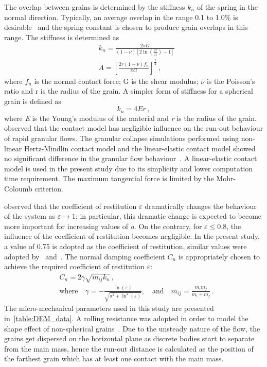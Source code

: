 The overlap between grains is determined by the stiffness 
$\textit{k}_{{n}}$ of the spring in the normal direction. Typically, 
an average overlap in the range 0.1 to 1.0\% is desirable~\citep{Zenit2005} and 
the spring constant is chosen to produce grain overlaps in this range. The 
stiffness is determined as
\begin{align}
& \textit{k}_{{n}}=\frac{2 \pi 
G}{(1-\nu)\left[2\ln(\frac{2r}{A})-1\right]} \\ 
& A = \left[\frac{2r(1-\nu)f_{n}}{\pi G}\right]^{\frac{1	}{2}}\,,
\end{align}
where $f_{n}$ is the normal contact force; G is the shear modulus; $\nu$ is the 
Poisson's ratio and r is the radius of the grain. A simpler form of stiffness 
for a spherical grain is defined as
\begin{equation}
\textit{k}_{{n}}=4Er\,,
\end{equation}
where \textit{E} is the Young's modulus of the material and \textit{r} is the 
radius of the grain.~\citet{Cambou2009} observed that the contact model has 
negligible influence on the run-out behaviour of rapid granular flows. The 
granular collapse simulations performed using non-linear Hertz-Mindlin contact 
model and the linear-elastic contact model showed no significant difference in 
the granular flow behaviour~\citep{Utili2014}. A linear-elastic contact model 
is used in the present study due to its simplicity and lower computation time 
requirement. The maximum tangential force is limited by the Mohr-Coloumb 
criterion. 

\citet{Staron2007a} observed that the coefficient of restitution $\varepsilon$ 
dramatically changes the behaviour of the system as $\varepsilon\rightarrow 
1$; in particular, this dramatic change is expected to become more important 
for increasing values of \textit{a}. On the contrary, for $\varepsilon \le 
0.8$, the influence of the coefficient of restitution becomes negligible. In 
the present study, a value of 0.75 is adopted as the coefficient of 
restitution, similar values were adopted 
by~\citet{Girolami} and~\citet{Zenit2005}. The normal damping coefficient 
$C_{{n}}$ is appropriately chosen to achieve the required coefficient of 
restitution 
$\varepsilon$:
\begin{align}
& C_{{n}}=2\gamma \sqrt{m_{{ij}}k_{{n}}} \,,\\ 
& \mbox{where} \quad \gamma = -\frac{\ln(\varepsilon)}{\sqrt{\pi^{2}+\ln^2 
(\varepsilon)}},\quad \mbox{and} \quad 
\textit{m}_{{ij}}=\frac{\textit{m}_{{i}}\textit{m}_{{j}}}{\textit{m}_{{i}}
 + \textit{m}_{{j}}} \,.
\end{align}
%
The micro-mechanical parameters used in this study are presented 
in~\cref{table:DEM_data}. A rolling resistance was adopted in order to 
model the shape effect of non-spherical grains~\citep{Iwashita1998}. Due to the 
unsteady nature of the flow, the grains get dispersed on the horizontal plane 
as discrete bodies start to separate from the main mass, hence the run-out 
distance is calculated as the position of the farthest grain which has at least 
one contact with the main mass.
%

